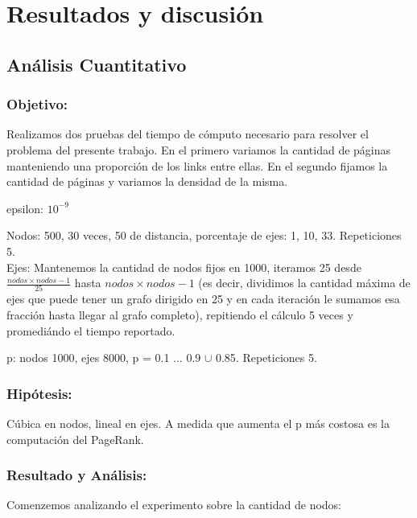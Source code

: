 \section{Resultados y discusión}

\subsection{Análisis Cuantitativo}

\subsubsection{Objetivo:}

Realizamos dos pruebas del tiempo de cómputo necesario para resolver el problema del presente trabajo.
En el primero variamos la cantidad de páginas manteniendo una proporción de los links entre ellas.
En el segundo fijamos la cantidad de páginas y variamos la densidad de la misma.

epsilon: $10^{-9}$

Nodos: 500, 30 veces, 50 de distancia, porcentaje de ejes: 1, 10, 33. Repeticiones 5. 
\\
Ejes: Mantenemos la cantidad de nodos fijos en 1000, iteramos 25 desde $\frac{nodos \times nodos-1}{25}$ hasta $nodos \times nodos-1$ (es decir, dividimos la cantidad máxima de ejes que puede tener un grafo dirigido en 25 y en cada iteración le sumamos esa fracción hasta llegar al grafo completo), repitiendo el cálculo 5 veces y promediándo el tiempo reportado.

p: nodos 1000, ejes 8000, p = {0.1 ... 0.9} $\cup$ {0.85}. Repeticiones 5.

\subsubsection{Hipótesis:}

Cúbica en nodos, lineal en ejes. A medida que aumenta el p más costosa es la computación del PageRank.

\subsubsection{Resultado y Análisis: }

Comenzemos analizando el experimento sobre la cantidad de nodos:

